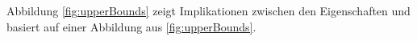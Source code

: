 \documentclass[a4paper,12pt]{article}
\begin{document}
\noindent Abbildung \ref{fig:upperBounds} zeigt Implikationen zwischen den Eigenschaften und basiert auf einer Abbildung aus \ref{fig:upperBounds}.


\newpage


\end{document}
